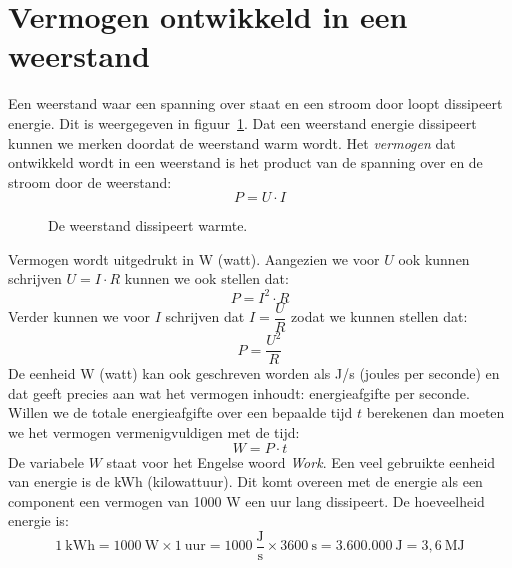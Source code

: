\section{Vermogen ontwikkeld in een weerstand}
Een weerstand waar een spanning over staat en een stroom door loopt dissipeert energie. Dit is weergegeven in
figuur~\ref{fig:gelvermogensdissipatie}. Dat een weerstand energie dissipeert kunnen we merken doordat de
weerstand warm wordt.
Het \textsl{vermogen} dat ontwikkeld wordt in een weerstand is het product van de spanning over
en de stroom door de weerstand:
%
\begin{equation}
P = U\cdot I 
\end{equation}

\begin{figure}[!ht]
\centering
{}
\caption{De weerstand dissipeert warmte.}
\label{fig:gelvermogensdissipatie}
\end{figure}


Vermogen wordt uitgedrukt in W (watt). Aangezien we voor $U$ ook kunnen schrijven $U=I\cdot R$
kunnen we ook stellen dat:
\begin{equation}
P = I^2\cdot R
\end{equation}
Verder kunnen we voor $I$ schrijven dat $I=\dfrac{U}{R}$ zodat we kunnen stellen dat:
\begin{equation}
P = \dfrac{U^2}{R}
\end{equation}
%
De eenheid W (watt) kan ook geschreven worden als J/s (joules per seconde) en dat geeft precies
aan wat het vermogen inhoudt: energieafgifte per seconde. Willen we de totale energieafgifte
over een bepaalde tijd $t$ berekenen dan moeten we het vermogen vermenigvuldigen met de tijd:
%
\begin{equation}
W = P\cdot t
\end{equation}
%
De variabele $W$ staat voor het Engelse woord \textsl{Work}. Een veel gebruikte eenheid van energie
is de kWh (kilowattuur). Dit komt overeen met de energie
als een component een vermogen van 1000 W een uur lang dissipeert. De hoeveelheid energie is:
%
\begin{equation}
1\ \mathrm{kWh} = 1000\ \mathrm{W} \times 1\ \mathrm{uur} = 1000\ \dfrac{\mathrm{J}}{\mathrm{s}} \times 3600\ \mathrm{s} = 3.600.000\ \mathrm{J} = 3,6\ \mathrm{MJ}
\end{equation}

